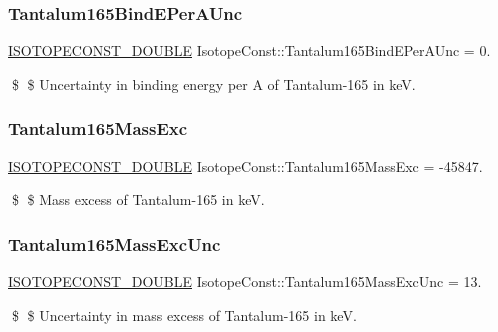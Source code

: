 \subsubsection{\texorpdfstring{Tantalum165\+Bind\+E\+Per\+A\+Unc}{Tantalum165BindEPerAUnc}}
{\footnotesize\ttfamily \mbox{\hyperlink{group___isotope_const-_macros_ga8f45a7272ce02c0b4c65c44636ed719a}{I\+S\+O\+T\+O\+P\+E\+C\+O\+N\+S\+T\+\_\+\+D\+O\+U\+B\+LE}} Isotope\+Const\+::\+Tantalum165\+Bind\+E\+Per\+A\+Unc = 0.}

\$ \$ Uncertainty in binding energy per A of Tantalum-\/165 in keV. \mbox{\label{group___isotope_const-_tantalum-_ta165_gaa22b3a77b39fd8afdd56b78080f35847}} 
\subsubsection{\texorpdfstring{Tantalum165\+Mass\+Exc}{Tantalum165MassExc}}
{\footnotesize\ttfamily \mbox{\hyperlink{group___isotope_const-_macros_ga8f45a7272ce02c0b4c65c44636ed719a}{I\+S\+O\+T\+O\+P\+E\+C\+O\+N\+S\+T\+\_\+\+D\+O\+U\+B\+LE}} Isotope\+Const\+::\+Tantalum165\+Mass\+Exc = -\/45847.}

\$ \$ Mass excess of Tantalum-\/165 in keV. \mbox{\label{group___isotope_const-_tantalum-_ta165_ga3b5da3ff70cb55124d347687cd48b51b}} 
\subsubsection{\texorpdfstring{Tantalum165\+Mass\+Exc\+Unc}{Tantalum165MassExcUnc}}
{\footnotesize\ttfamily \mbox{\hyperlink{group___isotope_const-_macros_ga8f45a7272ce02c0b4c65c44636ed719a}{I\+S\+O\+T\+O\+P\+E\+C\+O\+N\+S\+T\+\_\+\+D\+O\+U\+B\+LE}} Isotope\+Const\+::\+Tantalum165\+Mass\+Exc\+Unc = 13.}

\$ \$ Uncertainty in mass excess of Tantalum-\/165 in keV. \mbox{\label{group___isotope_const-_tantalum-_ta165_gab5df7a8acd4e51f88969f04ea8185022}} 
